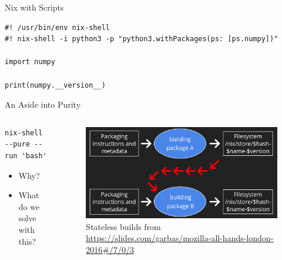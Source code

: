 \documentclass[bigger,unknownkeysallowed,aspectratio=169,red,colorblocks]{beamer}
\begin{document}
\begin{frame}[label={sec:org2dd43b0},fragile]{Nix with Scripts}
 \begin{verbatim}
#! /usr/bin/env nix-shell
#! nix-shell -i python3 -p "python3.withPackages(ps: [ps.numpy])"

import numpy

print(numpy.__version__)
\end{verbatim}
\end{frame}
\begin{frame}[label={sec:org7f75524},fragile]{An Aside into Purity}
 \begin{columns}
\begin{column}{0.4\columnwidth}
\begin{verbatim}
nix-shell --pure --run 'bash'
\end{verbatim}
\begin{itemize}
\item Why?
\item What do we solve with this?
\end{itemize}
\end{column}

\begin{column}{0.6\columnwidth}
\begin{figure}[htbp]
\centering
\includegraphics[width=.9\linewidth]{images/A_screenshot/2020-05-22_23-57-17_screenshot.png}
\caption{Stateless builds from \url{https://slides.com/garbas/mozilla-all-hands-london-2016\#/7/0/3}}
\end{figure}
\end{column}
\end{columns}
\end{frame}
\end{document}
